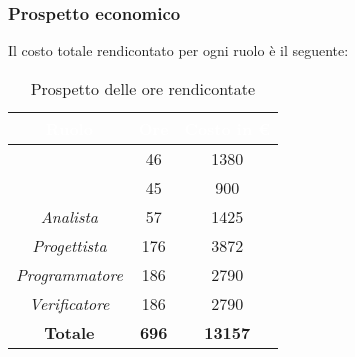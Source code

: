 \subsubsection{Prospetto economico}
Il costo totale rendicontato per ogni ruolo è il seguente:
\begin{table}[H]
	\begin{center}
		\begin{tabular}{ |c c c| }
			\rowcolor{darkblue} 
			\textcolor{white}{\textbf{Ruolo}} & \textcolor{white}{\textbf{Ore}} & \textcolor{white}{\textbf{Costo in €}}\\ \hline
			{\Responsabile} 			& 46	& 1380 \\ \hline
			{\Amministratore}			& 45	& 900 \\ \hline
			\textit{Analista} 			& 57	& 1425\\ \hline
			\textit{Progettista} 		& 176	& 3872 \\ \hline
			\textit{Programmatore} 		& 186 	& 2790 \\ \hline
			\textit{Verificatore} 		& 186	& 2790 \\ \hline
			\textbf{Totale} & \textbf{696} & \textbf{13157} \\ \hline
		\end{tabular}
		\caption{Prospetto delle ore rendicontate}
	\end{center}
\end{table}
